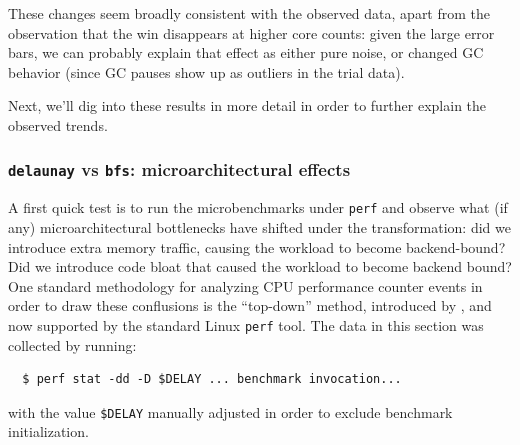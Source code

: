 \documentclass[leqno,11pt]{article}
\begin{document}
These changes seem broadly consistent with the observed data, apart from the
observation that the win disappears at higher core counts: given the large error
bars, we can probably explain that effect as either pure noise, or changed GC
behavior (since GC pauses show up as outliers in the trial data).

Next, we'll dig into these results in more detail in order to further explain
the observed trends.



\subsubsection{\texttt{delaunay} vs \texttt{bfs}: microarchitectural effects}
A first quick test is to run the microbenchmarks under \texttt{perf} and observe
what (if any) microarchitectural bottlenecks have shifted under the
transformation: did we introduce extra memory traffic, causing the workload to
become backend-bound? Did we introduce code bloat that caused the workload to
become backend bound? One standard methodology for analyzing CPU performance
counter events in order to draw these conflusions is the ``top-down'' method,
introduced by \citet{topdown-paper}, and now supported by the standard Linux
\texttt{perf} tool. The data in this section was collected by running:
\begin{verbatim}
  $ perf stat -dd -D $DELAY ... benchmark invocation...
\end{verbatim}
with the value \texttt{\$DELAY} manually adjusted in order to exclude benchmark
initialization.
\end{document}
